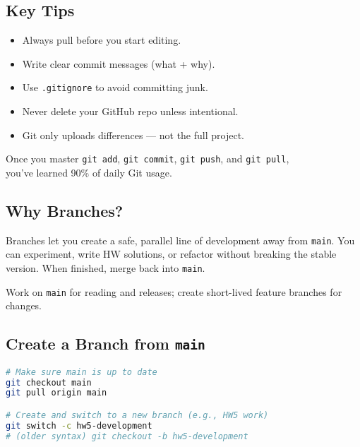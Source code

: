 \documentclass[11pt,letterpaper]{article}
\newcommand{\code}[1]{\textcolor{codeorange}{\texttt{#1}}}
\begin{document}
\subsection{Key Tips}
\begin{itemize}
    \item Always pull before you start editing.
    \item Write clear commit messages (what + why).
    \item Use \code{.gitignore} to avoid committing junk.
    \item Never delete your GitHub repo unless intentional.
    \item Git only uploads differences — not the full project.
\end{itemize}

\begin{quotebox}
Once you master \texttt{git add}, \texttt{git commit}, \texttt{git push}, and \texttt{git pull},\\
you’ve learned 90\% of daily Git usage.
\end{quotebox}


\subsection{Why Branches?}
Branches let you create a safe, parallel line of development away from \code{main}. You can experiment, write HW solutions, or refactor without breaking the stable version. When finished, merge back into \code{main}.

\begin{quotebox}
Work on \code{main} for reading and releases; create short-lived feature branches for changes.
\end{quotebox}

\subsection{Create a Branch from \code{main}}
\begin{lstlisting}[language=bash]
# Make sure main is up to date
git checkout main
git pull origin main

# Create and switch to a new branch (e.g., HW5 work)
git switch -c hw5-development
# (older syntax) git checkout -b hw5-development
\end{lstlisting}
\end{document}
